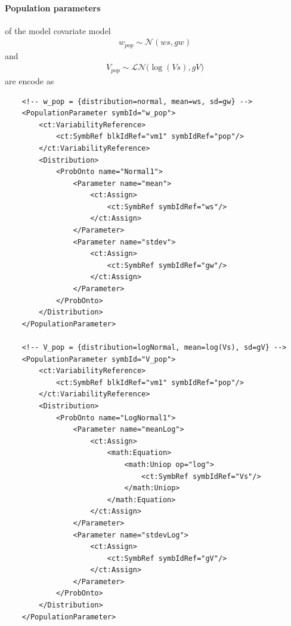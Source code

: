 \paragraph{Population parameters} of the model covariate model 
\begin{align*}
 w_{pop} \sim \mathcal {N}(ws, gw)
\end{align*}
and
\begin{align*}
 V_{pop} \sim \mathcal {LN}\big(\log(V\!s), gV\big)
\end{align*}
are encode as
\lstset{language=XML}
\begin{lstlisting}
    <!-- w_pop = {distribution=normal, mean=ws, sd=gw} -->
    <PopulationParameter symbId="w_pop">
        <ct:VariabilityReference>
            <ct:SymbRef blkIdRef="vm1" symbIdRef="pop"/>
        </ct:VariabilityReference>
        <Distribution>
            <ProbOnto name="Normal1">
                <Parameter name="mean">
                    <ct:Assign>
                        <ct:SymbRef symbIdRef="ws"/>
                    </ct:Assign>
                </Parameter>
                <Parameter name="stdev">
                    <ct:Assign>
                        <ct:SymbRef symbIdRef="gw"/>
                    </ct:Assign>
                </Parameter>
            </ProbOnto>
        </Distribution>
    </PopulationParameter>

    <!-- V_pop = {distribution=logNormal, mean=log(Vs), sd=gV} -->
    <PopulationParameter symbId="V_pop">
        <ct:VariabilityReference>
            <ct:SymbRef blkIdRef="vm1" symbIdRef="pop"/>
        </ct:VariabilityReference>
        <Distribution>
            <ProbOnto name="LogNormal1">
                <Parameter name="meanLog">
                    <ct:Assign>
                        <math:Equation>
                            <math:Uniop op="log">
                                <ct:SymbRef symbIdRef="Vs"/>
                            </math:Uniop>
                        </math:Equation>
                    </ct:Assign>
                </Parameter>
                <Parameter name="stdevLog">
                    <ct:Assign>
                        <ct:SymbRef symbIdRef="gV"/>
                    </ct:Assign>
                </Parameter>
            </ProbOnto>
        </Distribution>
    </PopulationParameter>
\end{lstlisting}



